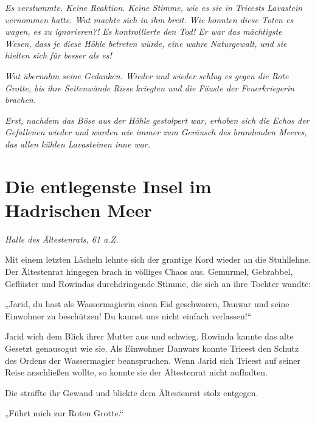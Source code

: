 \textit{Es verstummte. Keine Reaktion. Keine Stimme, wie es sie in Trieests Lavastein vernommen hatte. Wut machte sich in ihm breit. Wie konnten diese Toten es wagen, es zu ignorieren?! Es kontrollierte den Tod! Er war das mächtigste Wesen, dass je diese Höhle betreten würde, eine wahre Naturgewalt, und sie hielten sich für besser als es!}

\textit{Wut übernahm seine Gedanken. Wieder und wieder schlug es gegen die Rote Grotte, bis ihre Seitenwände Risse kriegten und die Fäuste der Feuerkriegerin brachen.}

\textit{Erst, nachdem das Böse aus der Höhle gestolpert war, erhoben sich die Echos der Gefallenen wieder und wurden wie immer zum Geräusch des brandenden Meeres, das allen kühlen Lavasteinen inne war.}
















\newpage
\section{Die entlegenste Insel im Hadrischen Meer}






\textit{Halle des Ältestenrats, 61 a.Z.}\bigskip



Mit einem letzten Lächeln lehnte sich der grantige Kord wieder an die Stuhllehne. Der Ältestenrat hingegen brach in völliges Chaos aus. Gemurmel, Gebrabbel, Geflüster und Rowindas durchdringende Stimme, die sich an ihre Tochter wandte:

„Jarid, du hast als Wassermagierin einen Eid geschworen, Danwar und seine Einwohner zu beschützen! Du kannst uns nicht einfach verlassen!“

Jarid wich dem Blick ihrer Mutter aus und schwieg. Rowinda kannte das alte Gesetzt genausogut wie sie. Als Einwohner Danwars konnte Trieest den Schutz des Ordens der Wassermagier beanspruchen. Wenn Jarid sich Trieest auf seiner Reise anschließen wollte, so konnte sie der Ältestenrat nicht aufhalten.

Die straffte ihr Gewand und blickte dem Ältestenrat stolz entgegen.

„Führt mich zur Roten Grotte.“\bigskip









